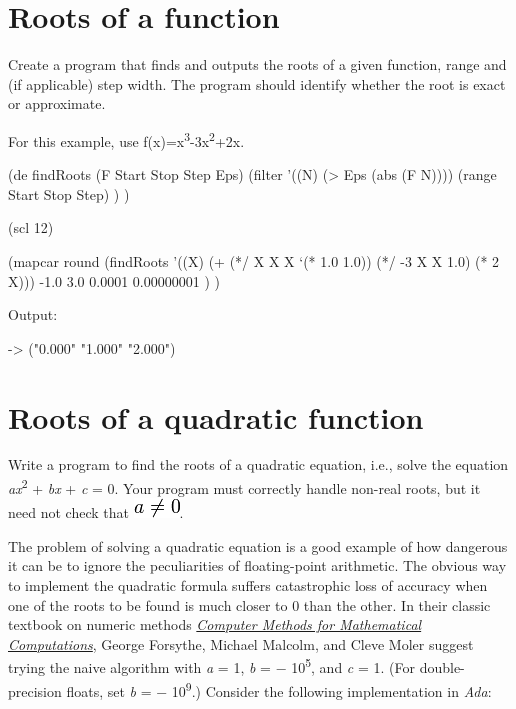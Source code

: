 \pagebreak{}
\section*{Roots of a function}

Create a program that finds and outputs the roots of a given function,
range and (if applicable) step width. The program should identify
whether the root is exact or approximate.

For this example, use
f(x)=x\textsuperscript{3}-3x\textsuperscript{2}+2x.

\begin{wideverbatim}

(de findRoots (F Start Stop Step Eps)
   (filter
      '((N) (> Eps (abs (F N))))
      (range Start Stop Step) ) )

(scl 12)

(mapcar round
   (findRoots
      '((X) (+ (*/ X X X `(* 1.0 1.0)) (*/ -3 X X 1.0) (* 2 X)))
      -1.0 3.0 0.0001 0.00000001 ) )

Output:

-> ("0.000" "1.000" "2.000")

\end{wideverbatim}

\pagebreak{}
\section*{Roots of a quadratic function}

Write a program to find the roots of a quadratic equation, i.e., solve
the equation \emph{a}\emph{x}\textsuperscript{2} + \emph{b}\emph{x} +
\emph{c} = 0. Your program must correctly handle non-real roots, but it
need not check that
\includegraphics[scale=.6]{graphics/df44347863ac17dc898a13f44f681d01.png}.

The problem of solving a quadratic equation is a good example of how
dangerous it can be to ignore the peculiarities of floating-point
arithmetic. The obvious way to implement the quadratic formula suffers
catastrophic loss of accuracy when one of the roots to be found is much
closer to 0 than the other. In their classic textbook on numeric methods
\emph{\href{http://www.pdas.com/fmm.htm}{Computer Methods for
Mathematical Computations}}, George Forsythe, Michael Malcolm, and Cleve
Moler suggest trying the naive algorithm with \emph{a} = 1, \emph{b} = −
10\textsuperscript{5}, and \emph{c} = 1. (For double-precision floats,
set \emph{b} = − 10\textsuperscript{9}.) Consider the following
implementation in \emph{Ada}:

